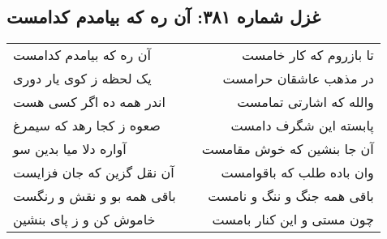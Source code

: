 \begin{center}
\section*{غزل شماره ۳۸۱: آن ره که بیامدم کدامست}
\label{sec:0381}
\begin{longtable}{l p{0.5cm} r}
آن ره که بیامدم کدامست
&&
تا بازروم که کار خامست
\\
یک لحظه ز کوی یار دوری
&&
در مذهب عاشقان حرامست
\\
اندر همه ده اگر کسی هست
&&
والله که اشارتی تمامست
\\
صعوه ز کجا رهد که سیمرغ
&&
پابسته این شگرف دامست
\\
آواره دلا میا بدین سو
&&
آن جا بنشین که خوش مقامست
\\
آن نقل گزین که جان فزایست
&&
وان باده طلب که باقوامست
\\
باقی همه بو و نقش و رنگست
&&
باقی همه جنگ و ننگ و نامست
\\
خاموش کن و ز پای بنشین
&&
چون مستی و این کنار بامست
\\
\end{longtable}
\end{center}
